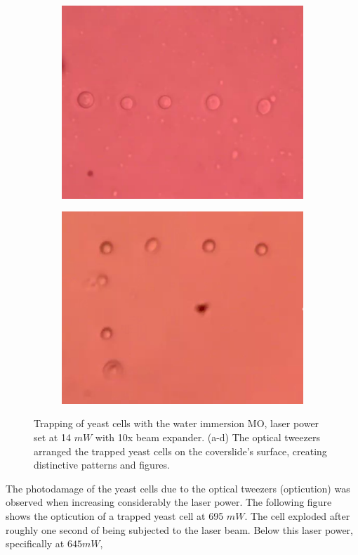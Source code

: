 \documentclass[letterpaper,12pt,oneside]{book}
\begin{document}
\begin{figure}[H]
\begin{subfigure}[b]{0.5\linewidth}
    \includegraphics[width=0.75\linewidth]{particlesnow.png} 
    \caption{}
    \label{fig7:c} 
  \end{subfigure}%
  \begin{subfigure}[b]{0.5\linewidth}
    \centering
    \includegraphics[width=0.75\linewidth]{Particles3.png} 
    \caption{}
    \label{fig7:d} 
  \end{subfigure} 
  \caption{Trapping of yeast cells with the water immersion MO, laser power set at 14 $mW$ with 10x beam expander. (a-d) The optical tweezers arranged the trapped yeast cells on the coverslide's surface, creating distinctive patterns and figures.}
  \label{figuresyeastcells}
\end{figure}
\noindent The photodamage of the yeast cells due to the optical tweezers (opticution) was observed when increasing considerably the laser power. The following figure shows the opticution of a trapped yeast cell at 695 $mW$. The cell exploded after roughly one second of being subjected to the laser beam. Below this laser power, specifically at $645 mW$,
\end{document}
